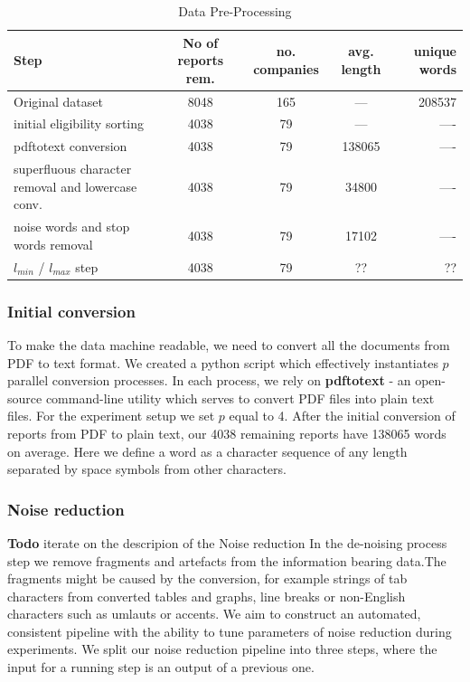 \documentclass[12pt,journal,letterpaper,oneside,onecolumn]{IEEEtran}
\begin{document}
\begin{table}[!ht]
  \begin{center}
    \caption{Data Pre-Processing}
    \label{tab:pre-process-steps}
    \begin{tabular}{l|c|c|c|r}
      \textbf{Step} & \textbf{No of reports rem.} & \textbf{no. companies} & \textbf{avg. length} & \textbf{unique words}\\
      \hline
      Original dataset & 8048 & 165 & --- &  208537 \\
      initial eligibility sorting & 4038 & 79 & --- & ---- \\
      pdftotext conversion & 4038 & 79 & 138065 & ---- \\
      superfluous character removal and lowercase conv. & 4038 & 79 & 34800 & ---- \\
      noise words and stop words removal & 4038 & 79 & 17102 & ---- \\
      $l_{min}$ / $l_{max}$ step & 4038 & 79 & ?? & ?? \\
    \end{tabular}
  \end{center}
\end{table}



\subsubsection{Initial conversion}
To make the data machine readable, we need to convert all the documents from PDF to text format. We created a python script which effectively instantiates $p$ parallel conversion processes. In each process, we rely on \textbf{pdftotext} - an open-source command-line utility which serves to convert PDF files into plain text files. For the experiment setup we set $p$ equal to 4. After the initial conversion of reports from PDF to plain text, our 4038 remaining reports have 138065 words on average. Here we define a word as a character sequence of any length separated by space symbols from other characters.

\subsubsection{Noise reduction}
\textbf{Todo} iterate on the descripion of the Noise reduction
In the de-noising process step we remove fragments and artefacts from the information bearing data.The fragments might be caused by the conversion, for example strings of tab characters from converted tables and graphs, line breaks or non-English characters such as umlauts or accents.
We aim to construct an automated, consistent pipeline with the ability to tune parameters of noise reduction during experiments. We split our noise reduction pipeline into three steps, where the input for a running step is an output of a previous one.
\end{document}
